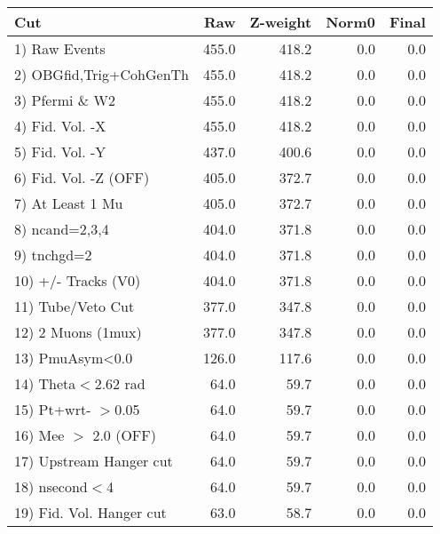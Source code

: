  \begin{table}[h!]\centering
 \begin{tabular}{||l||r|r|r|r||}
 \hline
 \hline
 Cut & Raw & Z-weight & Norm0 & Final \\
 \hline
  1) Raw Events           &       455.0 &       418.2 &         0.0 &         0.0 \\
  2) OBGfid,Trig+CohGenTh &       455.0 &       418.2 &         0.0 &         0.0 \\
  3) Pfermi \& W2         &       455.0 &       418.2 &         0.0 &         0.0 \\
  4) Fid. Vol. -X         &       455.0 &       418.2 &         0.0 &         0.0 \\
  5) Fid. Vol. -Y         &       437.0 &       400.6 &         0.0 &         0.0 \\
  6) Fid. Vol. -Z (OFF)   &       405.0 &       372.7 &         0.0 &         0.0 \\
  7) At Least 1 Mu        &       405.0 &       372.7 &         0.0 &         0.0 \\
  8) ncand=2,3,4          &       404.0 &       371.8 &         0.0 &         0.0 \\
  9) tnchgd=2             &       404.0 &       371.8 &         0.0 &         0.0 \\
 10) +/- Tracks (V0)      &       404.0 &       371.8 &         0.0 &         0.0 \\
 11) Tube/Veto Cut        &       377.0 &       347.8 &         0.0 &         0.0 \\
 12) 2 Muons (1mux)       &       377.0 &       347.8 &         0.0 &         0.0 \\
 13) PmuAsym<0.0          &       126.0 &       117.6 &         0.0 &         0.0 \\
 14) Theta$<$2.62 rad     &        64.0 &        59.7 &         0.0 &         0.0 \\
 15) Pt+wrt- $>$0.05      &        64.0 &        59.7 &         0.0 &         0.0 \\
 16) Mee $>$ 2.0  (OFF)   &        64.0 &        59.7 &         0.0 &         0.0 \\
 17) Upstream Hanger cut  &        64.0 &        59.7 &         0.0 &         0.0 \\
 18) nsecond$<$4          &        64.0 &        59.7 &         0.0 &         0.0 \\
 19) Fid. Vol. Hanger cut &        63.0 &        58.7 &         0.0 &         0.0 \\

\end{tabular}
\end{table}
